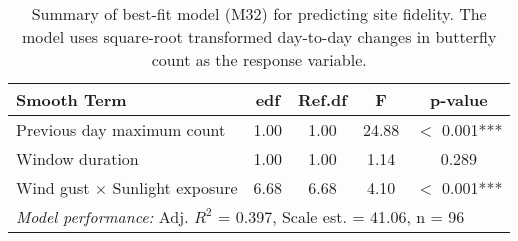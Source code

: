 \begin{table}[ht]
\centering
\caption[Summary of best-fit model (M32)]{Summary of best-fit model (M32) for predicting site fidelity. The model uses square-root transformed day-to-day changes in butterfly count as the response variable.}
\label{tab:m32_summary}
\begin{tabular}{lcccc}
\toprule
\textbf{Smooth Term} & \textbf{edf} & \textbf{Ref.df} & \textbf{F} & \textbf{p-value} \\
\midrule
Previous day maximum count & 1.00 & 1.00 & 24.88 & $<$ 0.001*** \\
Window duration & 1.00 & 1.00 & 1.14 & 0.289 \\
Wind gust × Sunlight exposure & 6.68 & 6.68 & 4.10 & $<$ 0.001*** \\
\midrule
\multicolumn{5}{l}{\textit{Model performance:} Adj. $R^2$ = 0.397, Scale est. = 41.06, n = 96} \\
\bottomrule
\end{tabular}
\end{table}